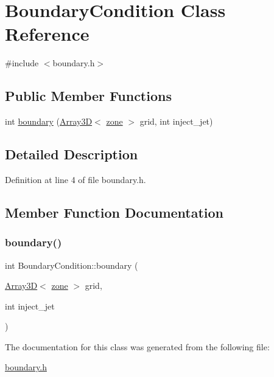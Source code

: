 \hypertarget{classBoundaryCondition}{}\section{Boundary\+Condition Class Reference}
\label{classBoundaryCondition}


{\ttfamily \#include $<$boundary.\+h$>$}

\subsection*{Public Member Functions}
\begin{DoxyCompactItemize}
\item 
int \hyperlink{classBoundaryCondition_ae8f57743167e1fec9b32f8febccf833a}{boundary} (\hyperlink{classTNT_1_1Array3D}{Array3D}$<$ \hyperlink{structzone}{zone} $>$ grid, int inject\+\_\+jet)
\end{DoxyCompactItemize}


\subsection{Detailed Description}


Definition at line 4 of file boundary.\+h.



\subsection{Member Function Documentation}
\mbox{\label{classBoundaryCondition_ae8f57743167e1fec9b32f8febccf833a}} 
\subsubsection{\texorpdfstring{boundary()}{boundary()}}
{\footnotesize\ttfamily int Boundary\+Condition\+::boundary (\begin{DoxyParamCaption}\item[{\hyperlink{classTNT_1_1Array3D}{Array3D}$<$ \hyperlink{structzone}{zone} $>$}]{grid,  }\item[{int}]{inject\+\_\+jet }\end{DoxyParamCaption})}



The documentation for this class was generated from the following file\+:\begin{DoxyCompactItemize}
\item 
\hyperlink{boundary_8h}{boundary.\+h}\end{DoxyCompactItemize}
